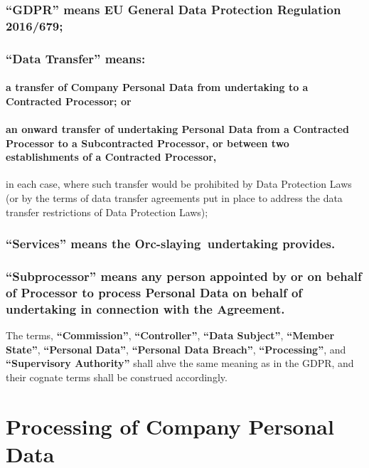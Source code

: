 \documentclass[a4paper]{article}
\newcommand{\services}{Orc-slaying}
\begin{document}
\subsubsection{\textbf{``GDPR''} means EU General Data Protection Regulation 2016/679;}

\subsubsection{\textbf{``Data Transfer''} means:}

\paragraph{a transfer of Company Personal Data from \gls{undertaking} to a Contracted Processor; or}

\paragraph{an onward transfer of \gls{undertaking} Personal Data from a Contracted Processor to a Subcontracted Processor, or between two establishments of a Contracted Processor,}

\noindent
in each case, where such transfer would be prohibited by Data Protection Laws (or by the terms of data transfer agreements put in place to address the data transfer restrictions of Data Protection Laws);

\subsubsection{\textbf{``Services''} means the \services\ \gls{undertaking} provides.}

\subsubsection{\textbf{``Subprocessor''} means any person appointed by or on behalf of Processor to process Personal Data on behalf of \gls{undertaking} in connection with the Agreement.}

The terms, \textbf{``Commission''}, \textbf{``Controller''}, \textbf{``Data Subject''}, \textbf{``Member State''}, \textbf{``Personal Data''}, \textbf{``Personal Data Breach''}, \textbf{``Processing''}, and \textbf{``Supervisory Authority''} shall ahve the same meaning as in the GDPR, and their cognate terms shall be construed accordingly.

\section{Processing of Company Personal Data}
\end{document}
